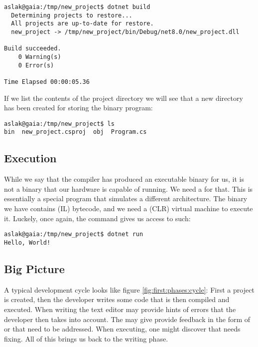 \begin{verbatim}
aslak@gaia:/tmp/new_project$ dotnet build
  Determining projects to restore...
  All projects are up-to-date for restore.
  new_project -> /tmp/new_project/bin/Debug/net8.0/new_project.dll

Build succeeded.
    0 Warning(s)
    0 Error(s)

Time Elapsed 00:00:05.36
\end{verbatim}

If we list the contents of the project directory we will see that a new  directory has been created for storing the binary program:

\begin{verbatim}
aslak@gaia:/tmp/new_project$ ls
bin  new_project.csproj  obj  Program.cs
\end{verbatim}

\subsection{Execution}

While we say that the compiler has produced an executable binary for us, it is not a binary that our hardware is capable of running. We need a  for that. This is essentially a special program that simulates a different architecture. The binary we have contains  (IL) bytecode, and we need a  (CLR) virtual machine to execute it. Luckely, once again, the  command gives us access to such:

\begin{verbatim}
aslak@gaia:/tmp/new_project$ dotnet run
Hello, World!
\end{verbatim}

\subsection{Big Picture}

A typical development cycle looks like figure \ref{fig:first:phases:cycle}: First a project is created, then the developer writes some code that is then compiled and executed. When writing the text editor may provide hints of errors that the developer then takes into account. The  may give provide feedback in the form of  or  that need to be addressed. When executing, one might discover  that needs fixing. All of this brings us back to the writing phase.

